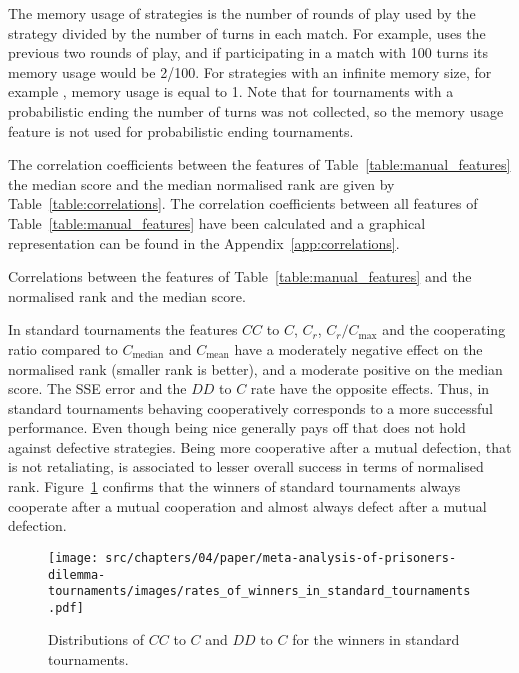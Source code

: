 The memory usage of strategies is the number of
rounds of play used by the strategy divided by the number of turns in each match.
For example, \WinnerTwelve uses the previous two rounds of play, and if participating
in a match with 100 turns its memory usage would be 2/100.
For strategies with an infinite memory size, for example \EvolvedFSMSixTeenNoiseZeroFive,
memory usage is equal to 1.
Note that for tournaments with a probabilistic
ending the number of turns was not collected, so the memory usage feature is not
used for probabilistic ending tournaments.

The correlation coefficients between the features of
Table~\ref{table:manual_features} the median score and the median normalised
rank are given by Table~\ref{table:correlations}. The correlation coefficients
between all features of Table~\ref{table:manual_features} have been calculated
and a graphical representation can be found in the
Appendix~\ref{app:correlations}.

\begin{table}[!htbp]
    \begin{center}
    \resizebox{.9\textwidth}{!}{
        
    }
\end{center}
\caption{Correlations between the features of Table~\ref{table:manual_features}
and the normalised rank and the median score.}\label{table:correlations}
\end{table}

In standard tournaments the features $CC$ to $C$, $C_r$, $C_r / C_{\text{max}}$
and the cooperating ratio compared to $C_{\text{median}}$ and $C_{\text{mean}}$
have a moderately negative effect on the normalised rank (smaller rank is better), and a moderate positive
on the median score. The SSE error and the $DD$ to $C$ rate have the opposite
effects. Thus, in standard tournaments behaving cooperatively corresponds to a
more successful performance. Even though being nice generally pays off
that does not hold against defective strategies. Being more cooperative after a mutual
defection, that is not retaliating, is associated to lesser overall success in terms of normalised rank.
Figure~\ref{fig:rates_of_winners_in_standard_tournaments} confirms that the
winners of standard tournaments always cooperate after a mutual cooperation and
almost always defect after a mutual defection.

\begin{figure}[!htbp]
    \centering
    \texttt{[image: src/chapters/04/paper/meta-analysis-of-prisoners-dilemma-tournaments/images/rates\_of\_winners\_in\_standard\_tournaments.pdf]}
    \caption{Distributions of $CC$ to $C$ and $DD$ to $C$ for the winners in
    standard tournaments.}\label{fig:rates_of_winners_in_standard_tournaments}
\end{figure}

